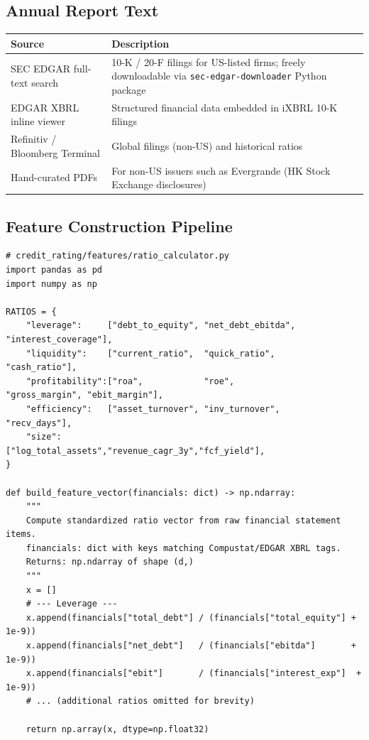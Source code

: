 \documentclass[12pt, a4paper]{article}
\begin{document}
\subsection{Annual Report Text}

\begin{center}
\begin{tabularx}{\linewidth}{l X}
  \toprule
  \textbf{Source} & \textbf{Description} \\
  \midrule
  SEC EDGAR full-text search & 10-K / 20-F filings for US-listed firms; freely downloadable via \texttt{sec-edgar-downloader} Python package \\
  EDGAR XBRL inline viewer & Structured financial data embedded in iXBRL 10-K filings \\
  Refinitiv / Bloomberg Terminal & Global filings (non-US) and historical ratios \\
  Hand-curated PDFs & For non-US issuers such as Evergrande (HK Stock Exchange disclosures) \\
  \bottomrule
\end{tabularx}
\end{center}

\subsection{Feature Construction Pipeline}

\begin{lstlisting}[caption={Ratio extraction pipeline (abbreviated)}, label=lst:pipeline]
# credit_rating/features/ratio_calculator.py
import pandas as pd
import numpy as np

RATIOS = {
    "leverage":     ["debt_to_equity", "net_debt_ebitda", "interest_coverage"],
    "liquidity":    ["current_ratio",  "quick_ratio",     "cash_ratio"],
    "profitability":["roa",            "roe",             "gross_margin", "ebit_margin"],
    "efficiency":   ["asset_turnover", "inv_turnover",    "recv_days"],
    "size":         ["log_total_assets","revenue_cagr_3y","fcf_yield"],
}

def build_feature_vector(financials: dict) -> np.ndarray:
    """
    Compute standardized ratio vector from raw financial statement items.
    financials: dict with keys matching Compustat/EDGAR XBRL tags.
    Returns: np.ndarray of shape (d,)
    """
    x = []
    # --- Leverage ---
    x.append(financials["total_debt"] / (financials["total_equity"] + 1e-9))
    x.append(financials["net_debt"]   / (financials["ebitda"]       + 1e-9))
    x.append(financials["ebit"]       / (financials["interest_exp"]  + 1e-9))
    # ... (additional ratios omitted for brevity)

    return np.array(x, dtype=np.float32)
\end{lstlisting}
\end{document}
